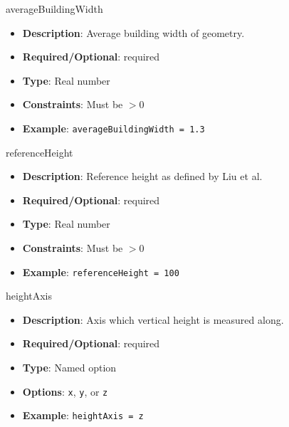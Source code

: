 averageBuildingWidth
\vspace{\the\parameterListSpacing}
\begin{itemize}
    \item {\bf Description}: Average building width of geometry.
    \item {\bf Required/Optional}: required
    \item {\bf Type}: Real number
    \item {\bf Constraints}: Must be $>0$
    \item {\bf Example}: \lstinline!averageBuildingWidth = 1.3!
\end{itemize}

referenceHeight
\vspace{\the\parameterListSpacing}
\begin{itemize}
    \item {\bf Description}: Reference height as defined by Liu et al.
    \item {\bf Required/Optional}: required
    \item {\bf Type}: Real number
    \item {\bf Constraints}: Must be $>0$
    \item {\bf Example}: \lstinline!referenceHeight = 100!
\end{itemize}


heightAxis
\vspace{\the\parameterListSpacing}
\begin{itemize}
    \item {\bf Description}: Axis which vertical height is measured along.
    \item {\bf Required/Optional}: required
    \item {\bf Type}: Named option
    \item {\bf Options}: \lstinline!x!, \lstinline!y!, or \lstinline!z!
    \item {\bf Example}: \lstinline!heightAxis = z!
\end{itemize}

